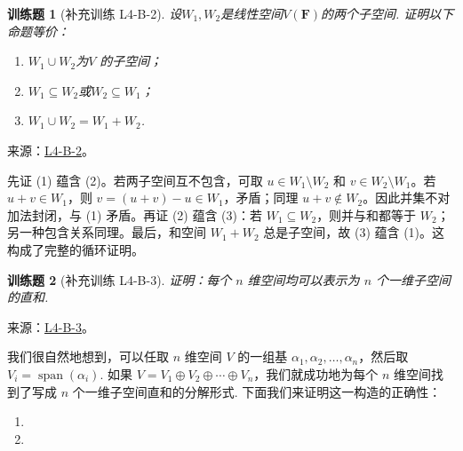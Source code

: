 \documentclass[12pt,fontset=fandol]{ctexart}
\newtheorem{exercise}{训练题}[section]
\begin{document}
\begin{exercise}[补充训练 L4-B-2]\label{prob:L4-B-2}
设$W_1,W_2$是线性空间$V(\mathbf{F})$的两个子空间. 证明以下命题等价：
        \begin{enumerate}
            \item $W_1 \cup W_2$为$V$ 的子空间；

            \item $W_1 \subseteq W_2$或$W_2 \subseteq W_1$；

            \item $W_1 \cup W_2=W_1+W_2$.
        \end{enumerate}
\end{exercise}
\noindent 来源：\href{https://github.com/yhwu-is/Linear-Algebra-Left-Undone/blob/new/%E8%AE%B2%E4%B9%89/%E4%B8%93%E9%A2%98/4%20%E7%BA%BF%E6%80%A7%E7%A9%BA%E9%97%B4%E7%9A%84%E8%BF%90%E7%AE%97.tex}{L4-B-2}。
\begin{solve}
先证 (1) 蕴含 (2)。若两子空间互不包含，可取 $u\in W_1\setminus W_2$ 和 $v\in W_2\setminus W_1$。若 $u+v\in W_1$，则 $v=(u+v)-u\in W_1$，矛盾；同理 $u+v\notin W_2$。因此并集不对加法封闭，与 (1) 矛盾。再证 (2) 蕴含 (3)：若 $W_1\subseteq W_2$，则并与和都等于 $W_2$；另一种包含关系同理。最后，和空间 $W_1+W_2$ 总是子空间，故 (3) 蕴含 (1)。这构成了完整的循环证明。
\end{solve}

\begin{exercise}[补充训练 L4-B-3]\label{prob:L4-B-3}
证明：每个 $n$ 维空间均可以表示为 $n$ 个一维子空间的直和.
\end{exercise}
\noindent 来源：\href{https://github.com/yhwu-is/Linear-Algebra-Left-Undone/blob/new/%E8%AE%B2%E4%B9%89/%E4%B8%93%E9%A2%98/4%20%E7%BA%BF%E6%80%A7%E7%A9%BA%E9%97%B4%E7%9A%84%E8%BF%90%E7%AE%97.tex}{L4-B-3}。
\begin{solve}
我们很自然地想到，可以任取 $n$ 维空间 $V$ 的一组基 $\alpha_1,\alpha_2,\ldots,\alpha_n$，然后取 $V_i = \operatorname{span}(\alpha_i)$. 如果 $V = V_1 \oplus V_2 \oplus \cdots \oplus V_n$，我们就成功地为每个 $n$ 维空间找到了写成 $n$ 个一维子空间直和的分解形式. 下面我们来证明这一构造的正确性：
            \begin{enumerate}
                \item
                \item
            \end{enumerate}
\end{solve}
\end{document}
